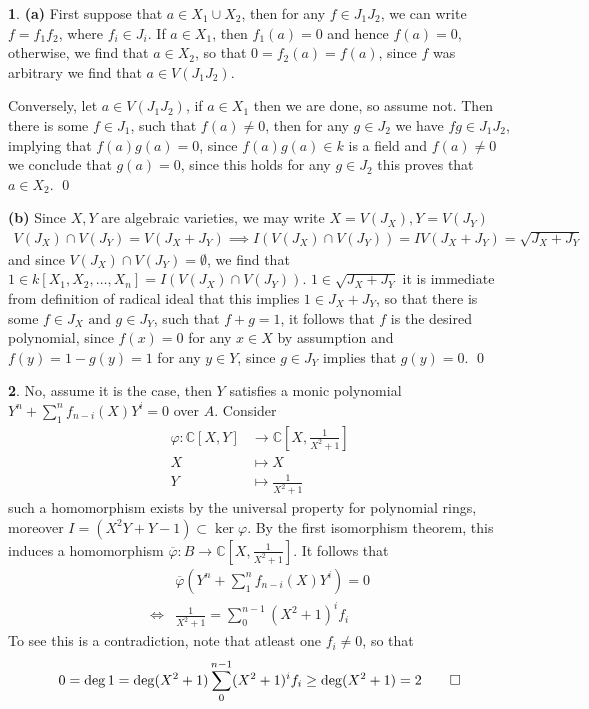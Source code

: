 \documentclass[11pt]{article}
\theoremstyle{definition}
\newtheorem{pb}{}
\newcommand{\tand}{\text{ and }}
\begin{document}
    \begin{pb}
        \textbf{(a)} First suppose that \(a \in X_1 \cup X_2\), then for any \(f \in J_1J_2\), we can write \(f = f_1f_2\), where \(f_i \in J_i\). If \(a \in X_1\), then \(f_1(a) = 0\) and hence \(f(a) = 0\), otherwise, we find that \(a \in X_2\), so that \(0 = f_2(a) = f(a)\),  since \(f\) was arbitrary we find that \(a \in V(J_1J_2)\). 

        Conversely, let \(a \in V(J_1J_2)\), if \(a \in X_1\) then we are done, so assume not. Then there is some \(f \in J_1\), such that \(f(a) \neq 0\), then for any \(g \in J_2\) we have \(fg \in J_1J_2\), implying that \(f(a)g(a) = 0\), since \(f(a)g(a) \in k\) is a field and \(f(a) \neq 0\) we conclude that \(g(a) = 0\), since this holds for any \(g \in J_2\) this proves that \(a \in X_2\). \qed

        \textbf{(b)} Since \(X,Y\) are algebraic varieties, we may write \(X = V(J_X), Y = V(J_Y)\)
        \begin{align*}
            V(J_X)\cap V(J_Y) = V(J_X + J_Y) \implies I(V(J_X)\cap V(J_Y)) = IV(J_X + J_Y) = \sqrt{J_X + J_Y}
        \end{align*}
        and since \(V(J_X)\cap V(J_Y) = \emptyset\), we find that \(1 \in k[X_1,X_2,\hdots,X_n] = I(V(J_X)\cap V(J_Y))\).
        \(1 \in \sqrt{J_X + J_Y}\) it is immediate from definition of radical ideal that this implies \(1 \in J_X + J_Y\), so that there is some \(f \in J_X \tand g \in J_Y\), such that \(f + g = 1\), it follows that \(f\) is the desired polynomial, since \(f(x) = 0\) for any \(x \in X\) by assumption and \(f(y) = 1 - g(y) = 1\) for any \(y \in Y\), since \(g \in J_Y\) implies that \(g(y) = 0\). \qed
    \end{pb}
    \begin{pb}
        No, assume it is the case, then \(Y\) satisfies a monic polynomial \(Y^n + \sum_1^{n} f_{n-i}(X)Y^i  = 0\) over \(A\). Consider \begin{align*}
            \varphi: \mathbb{C}[X,Y] &\to \mathbb{C}[X,\frac{1}{X^2 + 1}] \\
            X &\mapsto X \\
            Y &\mapsto \frac{1}{X^2 + 1}
        \end{align*}
        such a homomorphism exists by the universal property for polynomial rings, moreover \(I = (X^2Y + Y - 1) \subset \ker \varphi\). By the first isomorphism theorem, this induces a homomorphism \(\overline{\varphi}: B \to \mathbb{C}[X,\frac{1}{X^2 + 1}]\). It follows that
        \begin{align*}
            &\overline{\varphi}(Y^n + \sum_1^{n} f_{n-i}(X)Y^i)  = 0 \\
            \iff &\frac{1}{X^2 + 1} = \sum_0^{n-1} (X^2 + 1)^{i} f_{i}
        \end{align*}
        To see this is a contradiction, note that atleast one \(f_i \neq 0\), so that
        \begin{align*}
            0 = \deg 1 = \deg (X^2 + 1)\sum_0^{n-1} (X^2 + 1)^{i} f_{i} \geq \deg (X^2 + 1) = 2 \qed
        \end{align*}
    \end{pb}
\end{document}
